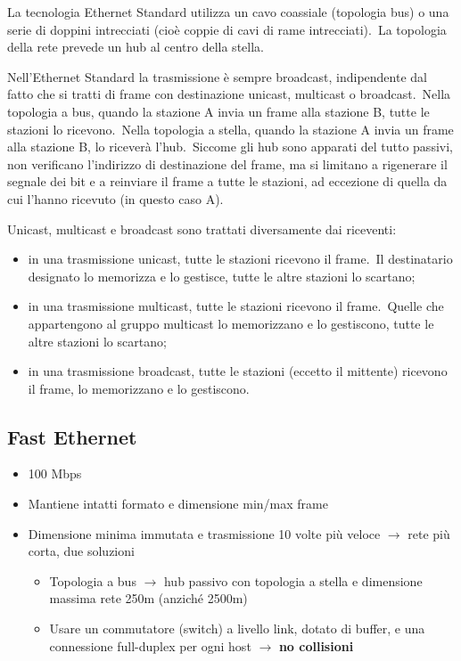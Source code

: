 La tecnologia Ethernet Standard utilizza un cavo coassiale (topologia bus) o una serie di doppini intrecciati (cioè coppie di cavi di rame intrecciati).\
La topologia della rete prevede un hub al centro della stella.

Nell'Ethernet Standard la trasmissione è sempre broadcast, indipendente dal fatto che si tratti di frame con destinazione unicast, multicast o broadcast.\
Nella topologia a bus, quando la stazione A invia un frame alla stazione B, tutte le stazioni lo ricevono.\
Nella topologia a stella, quando la stazione A invia un frame alla stazione B, lo riceverà l'hub.\
Siccome gli hub sono apparati del tutto passivi, non verificano l'indirizzo di destinazione del frame, ma si limitano a rigenerare il segnale dei bit e a reinviare il frame a tutte le stazioni, ad eccezione di quella da cui l'hanno ricevuto (in questo caso A).

Unicast, multicast e broadcast sono trattati diversamente dai riceventi:
\begin{itemize}
    \item in una trasmissione unicast, tutte le stazioni ricevono il frame.\
          Il destinatario designato lo memorizza e lo gestisce, tutte le altre stazioni lo scartano;
    \item in una trasmissione multicast, tutte le stazioni ricevono il frame.\
          Quelle che appartengono al gruppo multicast lo memorizzano e lo gestiscono, tutte le altre stazioni lo scartano;
    \item in una trasmissione broadcast, tutte le stazioni (eccetto il mittente) ricevono il frame, lo memorizzano e lo gestiscono.
\end{itemize}

\subsection{Fast Ethernet}

\begin{itemize}
    \item 100 Mbps
    \item Mantiene intatti formato e dimensione min/max frame
    \item Dimensione minima immutata e trasmissione 10 volte più veloce $\rightarrow$ rete più corta, due soluzioni
          \begin{itemize}
              \item Topologia a bus $\rightarrow$ hub passivo con topologia a stella e dimensione massima rete 250m (anziché 2500m)
              \item Usare un commutatore (switch) a livello link, dotato di buffer, e una connessione full-duplex per ogni host $\rightarrow$ \textbf{no collisioni}
          \end{itemize}
\end{itemize}


